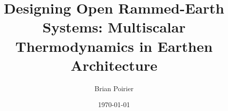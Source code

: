 \documentclass{article}
\begin{document}
\title{Designing Open Rammed-Earth Systems: Multiscalar Thermodynamics in Earthen Architecture}
\author{Brian Poirier}
\date{\today}
\maketitle
\clearpage

\tableofcontents
\clearpage



\clearpage










\printbibliography
\end{document}
